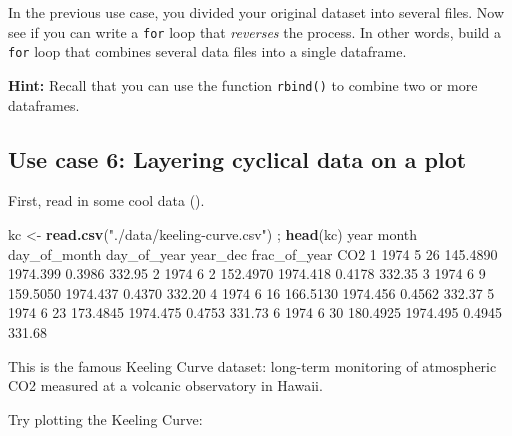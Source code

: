 \documentclass[]{book}
\newenvironment{Shaded}{\begin{snugshade}}{\end{snugshade}}
\newcommand{\DecValTok}[1]{\textcolor[rgb]{0.00,0.00,0.81}{#1}}
\newcommand{\FloatTok}[1]{\textcolor[rgb]{0.00,0.00,0.81}{#1}}
\newcommand{\KeywordTok}[1]{\textcolor[rgb]{0.13,0.29,0.53}{\textbf{#1}}}
\newcommand{\NormalTok}[1]{#1}
\newcommand{\StringTok}[1]{\textcolor[rgb]{0.31,0.60,0.02}{#1}}
\begin{document}
In the previous use case, you divided your original dataset into several files. Now see if you can write a \texttt{for} loop that \emph{reverses} the process. In other words, build a \texttt{for} loop that combines several data files into a single dataframe.

\textbf{Hint:} Recall that you can use the function \texttt{rbind()} to combine two or more dataframes.

\hypertarget{use-case-6-layering-cyclical-data-on-a-plot}{%
\subsection*{Use case 6: Layering cyclical data on a plot}\label{use-case-6-layering-cyclical-data-on-a-plot}}

First, read in some cool data ().

\begin{Shaded}
\begin{Highlighting}[]
\NormalTok{kc <-}\StringTok{ }\KeywordTok{read.csv}\NormalTok{(}\StringTok{"./data/keeling-curve.csv"}\NormalTok{) ; }\KeywordTok{head}\NormalTok{(kc)}
\NormalTok{  year month day_of_month day_of_year year_dec frac_of_year    CO2}
\DecValTok{1} \DecValTok{1974}     \DecValTok{5}           \DecValTok{26}    \FloatTok{145.4890} \FloatTok{1974.399}       \FloatTok{0.3986} \FloatTok{332.95}
\DecValTok{2} \DecValTok{1974}     \DecValTok{6}            \DecValTok{2}    \FloatTok{152.4970} \FloatTok{1974.418}       \FloatTok{0.4178} \FloatTok{332.35}
\DecValTok{3} \DecValTok{1974}     \DecValTok{6}            \DecValTok{9}    \FloatTok{159.5050} \FloatTok{1974.437}       \FloatTok{0.4370} \FloatTok{332.20}
\DecValTok{4} \DecValTok{1974}     \DecValTok{6}           \DecValTok{16}    \FloatTok{166.5130} \FloatTok{1974.456}       \FloatTok{0.4562} \FloatTok{332.37}
\DecValTok{5} \DecValTok{1974}     \DecValTok{6}           \DecValTok{23}    \FloatTok{173.4845} \FloatTok{1974.475}       \FloatTok{0.4753} \FloatTok{331.73}
\DecValTok{6} \DecValTok{1974}     \DecValTok{6}           \DecValTok{30}    \FloatTok{180.4925} \FloatTok{1974.495}       \FloatTok{0.4945} \FloatTok{331.68}
\end{Highlighting}
\end{Shaded}

This is the famous Keeling Curve dataset: long-term monitoring of atmospheric CO2 measured at a volcanic observatory in Hawaii.

Try plotting the Keeling Curve:
\end{document}
